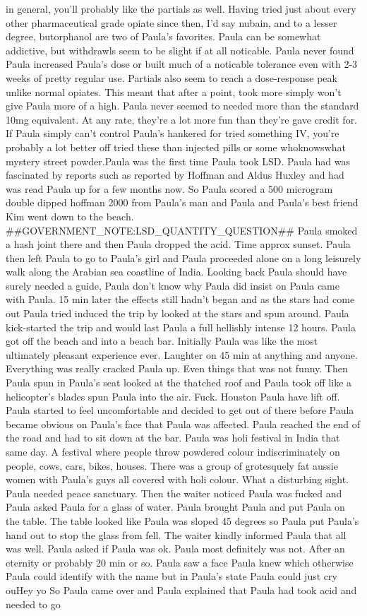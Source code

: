 \documentclass[12pt]{book}
\begin{document}
in general, you'll probably like the partials as well. Having tried just about every other pharmaceutical grade opiate since then, I'd say nubain, and to a lesser degree, butorphanol are two of Paula's favorites. Paula can be somewhat addictive, but withdrawls seem to be slight if at all noticable. Paula never found Paula increased Paula's dose or built much of a noticable tolerance even with 2-3 weeks of pretty regular use. Partials also seem to reach a dose-response peak unlike normal opiates. This meant that after a point, took more simply won't give Paula more of a high. Paula never seemed to needed more than the standard 10mg equivalent. At any rate, they're a lot more fun than they're gave credit for. If Paula simply can't control Paula's hankered for tried something IV, you're probably a lot better off tried these than injected pills or some whoknowswhat mystery street powder.Paula was the first time Paula took LSD. Paula had was fascinated by reports such as reported by Hoffman and Aldus Huxley and had was read Paula up for a few months now. So Paula scored a 500 microgram double dipped hoffman 2000 from Paula's man and Paula and Paula's best friend Kim went down to the beach. \#\#GOVERNMENT\_NOTE:LSD\_QUANTITY\_QUESTION\#\# Paula smoked a hash joint there and then Paula dropped the acid. Time approx sunset. Paula then left Paula to go to Paula's girl and Paula proceeded alone on a long leisurely walk along the Arabian sea coastline of India. Looking back Paula should have surely needed a guide, Paula don't know why Paula did insist on Paula came with Paula. 15 min later the effects still hadn't began and as the stars had come out Paula tried induced the trip by looked at the stars and spun around. Paula kick-started the trip and would last Paula a full hellishly intense 12 hours. Paula got off the beach and into a beach bar. Initially Paula was like the most ultimately pleasant experience ever. Laughter on 45 min at anything and anyone. Everything was really cracked Paula up. Even things that was not funny. Then Paula spun in Paula's seat looked at the thatched roof and Paula took off like a helicopter's blades spun Paula into the air. Fuck. Houston Paula have lift off. Paula started to feel uncomfortable and decided to get out of there before Paula became obvious on Paula's face that Paula was affected. Paula reached the end of the road and had to sit down at the bar. Paula was holi festival in India that same day. A festival where people throw powdered colour indiscriminately on people, cows, cars, bikes, houses. There was a group of grotesquely fat aussie women with Paula's guys all covered with holi colour. What a disturbing sight. Paula needed peace sanctuary. Then the waiter noticed Paula was fucked and Paula asked Paula for a glass of water. Paula brought Paula and put Paula on the table. The table looked like Paula was sloped 45 degrees so Paula put Paula's hand out to stop the glass from fell. The waiter kindly informed Paula that all was well. Paula asked if Paula was ok. Paula most definitely was not. After an eternity or probably 20 min or so. Paula saw a face Paula knew which otherwise Paula could identify with the name but in Paula's state Paula could just cry ouHey yo So Paula came over and Paula explained that Paula had took acid and needed to go 
\end{document}
